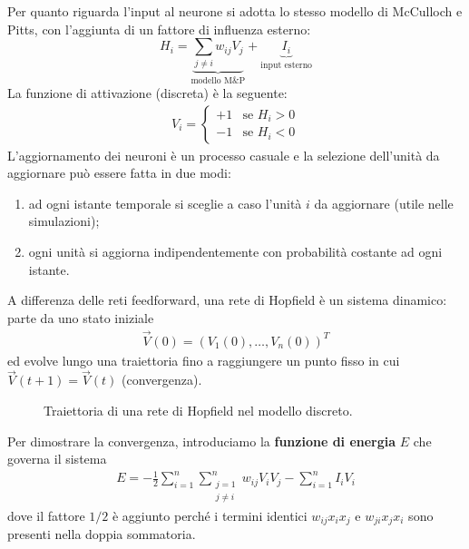 Per quanto riguarda l'input al neurone si adotta lo stesso modello di McCulloch e Pitts, con l'aggiunta di un fattore di influenza esterno:
\begin{displaymath}
	H_i = \underbrace{\sum_{j \neq i} w_{ij} V_j}_\textrm{modello M\&P} + \underbrace{I_i}_\textrm{input esterno}
\end{displaymath}
La funzione di attivazione (discreta) è la seguente:
\begin{align}
	V_i = \begin{cases}
		+1 & \text{se } H_i > 0 \\
		-1 & \text{se } H_i < 0
	\end{cases}\label{eq:learningrule}
\end{align}
L'aggiornamento dei neuroni è un processo casuale e la selezione dell'unità da aggiornare può essere fatta in due modi:
\begin{enumerate}
	\item ad ogni istante temporale si sceglie a caso l'unità $i$ da aggiornare (utile nelle simulazioni);
	\item ogni unità si aggiorna indipendentemente con probabilità costante ad ogni istante.
\end{enumerate}
A differenza delle reti feedforward, una rete di Hopfield è un sistema dinamico: parte da uno stato iniziale
\begin{align*}
	\vec{V}(0) = (V_1(0), \dots, V_n(0))^T
\end{align*}
ed evolve lungo una traiettoria fino a raggiungere un punto fisso in cui $\vec{V}(t+1) = \vec{V}(t)$ (convergenza).
\begin{figure}[h!]
	\centering
	\caption{Traiettoria di una rete di Hopfield nel modello discreto.}
\end{figure}

\noindent Per dimostrare la convergenza, introduciamo la \textbf{funzione di energia} $E$ che governa il sistema
\begin{align}
	E = - \frac{1}{2} \sum_{i=1}^n \sum_{\substack{j=1 \\ j \neq i}}^n w_{ij} V_i V_j - \sum_{i=1}^n I_i V_i\label{eq:energy}
\end{align}
dove il fattore $1/2$ è aggiunto perché i termini identici $w_{ij}x_i x_j$ e $w_{ji} x_j x_i$ sono presenti nella doppia sommatoria.

